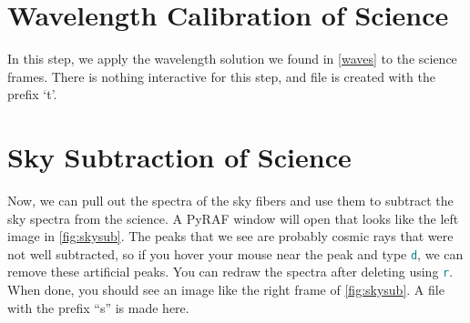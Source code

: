 \documentclass[12pt]{report}
\newcommand{\ty}[1]{\textcolor{teal}{\texttt{#1}}}
\begin{document}
\section{Wavelength Calibration of Science}
In this step, we apply the wavelength solution we found in \autoref{waves} to the science frames. There is nothing interactive for this step, and file is created with the prefix `t'.

\section{Sky Subtraction of Science}

Now, we can pull out the spectra of the sky fibers and use them to subtract the sky spectra from the science. A PyRAF window will open that looks like the left image in \autoref{fig:skysub}. The peaks that we see are probably cosmic rays that were not well subtracted, so if you hover your mouse near the peak and type \ty{d}, we can remove these artificial peaks. You can redraw the spectra after deleting using \ty{r}. When done, you should see an image like the right frame of \autoref{fig:skysub}. A file with the prefix ``s'' is made here.
\end{document}
